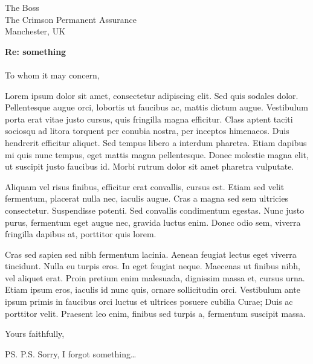 \documentclass{UoM_letter}
\begin{document}
\begin{letter}{The Boss \\ The Crimson Permanent Assurance \\ Manchester, UK}

\opening{\textbf{Re: something}\\\\To whom it may concern,}

Lorem ipsum dolor sit amet, consectetur adipiscing elit. Sed quis sodales dolor. Pellentesque augue orci, lobortis ut faucibus ac, mattis dictum augue. Vestibulum porta erat vitae justo cursus, quis fringilla magna efficitur. Class aptent taciti sociosqu ad litora torquent per conubia nostra, per inceptos himenaeos. Duis hendrerit efficitur aliquet. Sed tempus libero a interdum pharetra. Etiam dapibus mi quis nunc tempus, eget mattis magna pellentesque. Donec molestie magna elit, ut suscipit justo faucibus id. Morbi rutrum dolor sit amet pharetra vulputate.


Aliquam vel risus finibus, efficitur erat convallis, cursus est. Etiam sed velit fermentum, placerat nulla nec, iaculis augue. Cras a magna sed sem ultricies consectetur. Suspendisse potenti. Sed convallis condimentum egestas. Nunc justo purus, fermentum eget augue nec, gravida luctus enim. Donec odio sem, viverra fringilla dapibus at, porttitor quis lorem.


Cras sed sapien sed nibh fermentum lacinia. Aenean feugiat lectus eget viverra tincidunt. Nulla eu turpis eros. In eget feugiat neque. Maecenas ut finibus nibh, vel aliquet erat. Proin pretium enim malesuada, dignissim massa et, cursus urna. Etiam ipsum eros, iaculis id nunc quis, ornare sollicitudin orci. Vestibulum ante ipsum primis in faucibus orci luctus et ultrices posuere cubilia Curae; Duis ac porttitor velit. Praesent leo enim, finibus sed turpis a, fermentum suscipit massa.

\closing{Yours faithfully,}

\ps{P.S. Sorry, I forgot something\ldots}

\end{letter}
\end{document}
